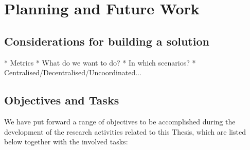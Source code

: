 \documentclass[12pt, a4paper,twoside]{tesi_upf}
\begin{document}
	\chapter{Planning and Future Work}
	\label{section:future_work}

		\section{Considerations for building a solution}
		\label{section:considerations}
			* Metrics
			* What do we want to do?
			* In which scenarios?
			* Centralised/Decentralised/Uncoordinated...
			
		\section{Objectives and Tasks}
		\label{section:objectives}
		We have put forward a range of objectives to be accomplished during the development of the research activities related to this Thesis, which are listed below together with the involved tasks:
\end{document}

